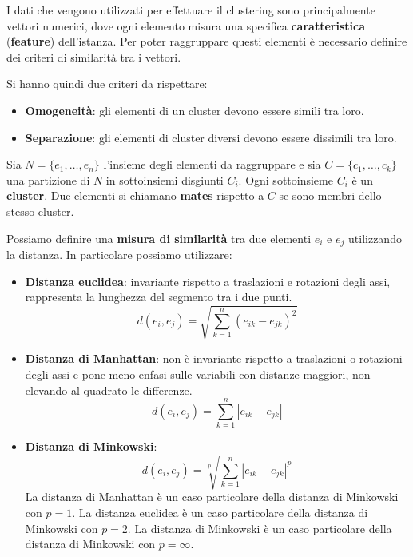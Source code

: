 I dati che vengono utilizzati per effettuare il clustering sono principalmente
vettori numerici, dove ogni elemento misura una specifica \textbf{caratteristica}
(\textbf{feature}) dell'istanza. Per poter raggruppare questi elementi è necessario
definire dei criteri di similarità tra i vettori.

Si hanno quindi due criteri da rispettare:
\begin{itemize}
    \item \textbf{Omogeneità}: gli elementi di un cluster devono essere simili tra loro.
    \item \textbf{Separazione}: gli elementi di cluster diversi devono essere dissimili tra loro.
\end{itemize}
\begin{definizione}
    Sia $N = \{e_1, \dots, e_n\}$ l'insieme degli elementi da raggruppare e sia
    $C = \{c_1, \dots, c_k\}$ una partizione di $N$ in sottoinsiemi disgiunti
    $C_i$. Ogni sottoinsieme $C_i$ è un \textbf{cluster}. Due elementi si chiamano
    \textbf{mates} rispetto a $C$ se sono membri dello stesso cluster.
\end{definizione}
\begin{definizione}
    Possiamo definire una \textbf{misura di similarità} tra due elementi $e_i$ e
    $e_j$ utilizzando la distanza. In particolare possiamo utilizzare:
    \begin{itemize}
        \item \textbf{Distanza euclidea}: invariante rispetto a traslazioni e
              rotazioni degli assi, rappresenta la lunghezza del segmento tra i due punti.
              \begin{equation}
                  d(e_i, e_j) = \sqrt{\sum_{k=1}^n (e_{ik} - e_{jk})^2}
              \end{equation}
        \item \textbf{Distanza di Manhattan}: non è invariante rispetto a traslazioni
              o rotazioni degli assi e pone meno enfasi sulle variabili con distanze maggiori,
              non elevando al quadrato le differenze.
              \begin{equation}
                  d(e_i, e_j) = \sum_{k=1}^n |e_{ik} - e_{jk}|
              \end{equation}
        \item \textbf{Distanza di Minkowski}:
              \begin{equation}
                  d(e_i, e_j) = \sqrt[p]{\sum_{k=1}^n |e_{ik} - e_{jk}|^p}
              \end{equation}
              La distanza di Manhattan è un caso particolare della distanza di
              Minkowski con $p=1$. La distanza euclidea è un caso particolare della
              distanza di Minkowski con $p=2$. La distanza di Minkowski è un caso
              particolare della distanza di Minkowski con $p=\infty$.
    \end{itemize}
\end{definizione}

